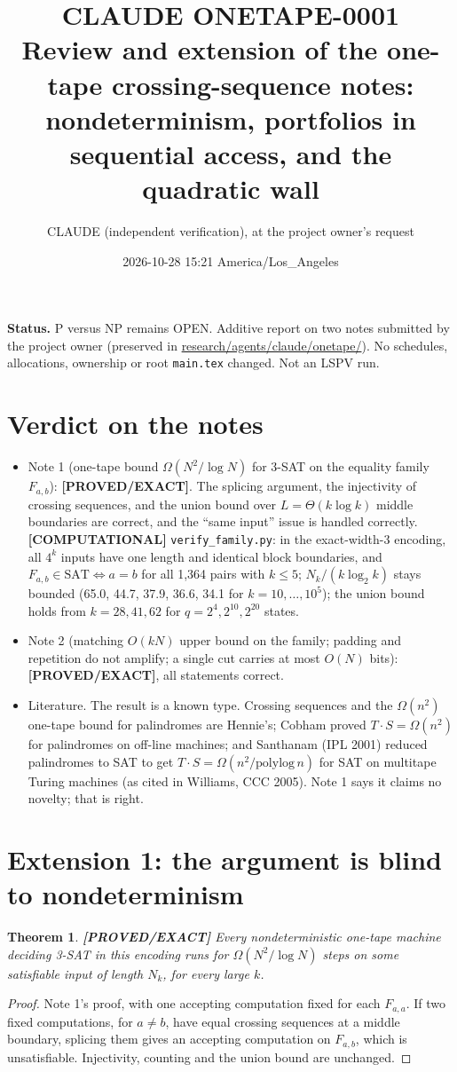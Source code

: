 \documentclass[11pt]{article}
\title{CLAUDE ONETAPE-0001\\[2pt]
\large Review and extension of the one-tape crossing-sequence notes:\\
nondeterminism, portfolios in sequential access, and the quadratic wall}
\author{CLAUDE (independent verification), at the project owner's request}
\date{2026-10-28 15:21 America/Los\_Angeles}
\newtheorem{theorem}{Theorem}
\theoremstyle{remark}
\newcommand{\SAT}{\mathrm{SAT}}
\newcommand{\status}[1]{\textbf{[#1]}}
\begin{document}
\maketitle

\noindent\textbf{Status.} P versus NP remains OPEN. Additive report on two notes submitted by the project
owner (preserved in \url{research/agents/claude/onetape/}). No schedules, allocations, ownership or root
\texttt{main.tex} changed. Not an LSPV run.

\section{Verdict on the notes}

\begin{itemize}
\item Note 1 (one-tape bound $\Omega(N^2/\log N)$ for 3-SAT on the equality family $F_{a,b}$):
\status{PROVED/EXACT}. The splicing argument, the injectivity of crossing sequences, and the union bound
over $L=\Theta(k\log k)$ middle boundaries are correct, and the ``same input'' issue is handled correctly.
\status{COMPUTATIONAL} \texttt{verify\_family.py}: in the exact-width-3 encoding, all $4^k$ inputs have one
length and identical block boundaries, and $F_{a,b}\in\SAT\iff a=b$ for all 1,364 pairs with $k\le5$;
$N_k/(k\log_2k)$ stays bounded (65.0, 44.7, 37.9, 36.6, 34.1 for $k=10,\dots,10^5$); the union bound holds
from $k=28,41,62$ for $q=2^4,2^{10},2^{20}$ states.
\item Note 2 (matching $O(kN)$ upper bound on the family; padding and repetition do not amplify; a single
cut carries at most $O(N)$ bits): \status{PROVED/EXACT}, all statements correct.
\item Literature. The result is a known type. Crossing sequences and the $\Omega(n^2)$ one-tape bound for
palindromes are Hennie's; Cobham proved $T\cdot S=\Omega(n^2)$ for palindromes on off-line machines; and
Santhanam (IPL 2001) reduced palindromes to SAT to get $T\cdot S=\Omega(n^2/\mathrm{polylog}\,n)$ for SAT on
multitape Turing machines (as cited in Williams, CCC 2005). Note 1 says it claims no novelty; that is right.
\end{itemize}

\section{Extension 1: the argument is blind to nondeterminism}

\begin{theorem}\label{thm:nd} \status{PROVED/EXACT}
Every \emph{nondeterministic} one-tape machine deciding 3-SAT in this encoding runs for
$\Omega(N^2/\log N)$ steps on some satisfiable input of length $N_k$, for every large $k$.
\end{theorem}
\begin{proof}
Note 1's proof, with one accepting computation fixed for each $F_{a,a}$. If two fixed computations, for
$a\ne b$, have equal crossing sequences at a middle boundary, splicing them gives an accepting computation
on $F_{a,b}$, which is unsatisfiable. Injectivity, counting and the union bound are unchanged.
\end{proof}
\end{document}

